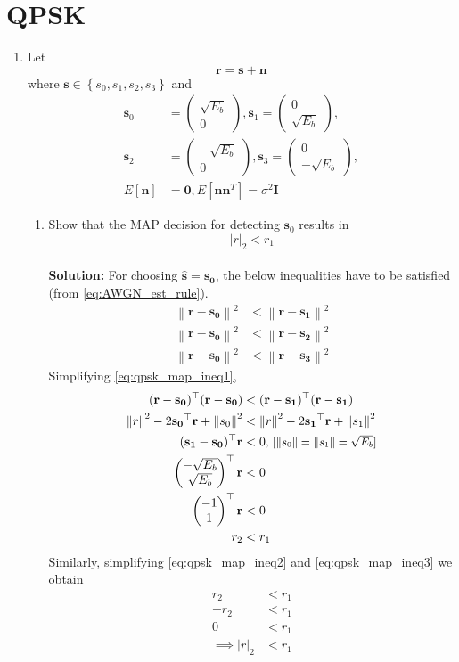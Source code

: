 \documentclass[journal,10pt,twocolumn]{IEEEtran}
\providecommand{\sbrak}[1]{\ensuremath{{}\left[#1\right]}}
\providecommand{\cbrak}[1]{\ensuremath{\left\{#1\right\}}}
\providecommand{\abs}[1]{\left\vert#1\right\vert}
\providecommand{\norm}[1]{\left\lVert#1\right\rVert}
\newcommand{\solution}{\noindent \textbf{Solution: }}
\newcommand{\myvec}[1]{\ensuremath{\begin{pmatrix}#1\end{pmatrix}}}
\let\vec\mathbf
\begin{document}
\section{QPSK}
\begin{enumerate}
\item
Let
\begin{equation}
\mathbf{r} = \mathbf{s}+ \mathbf{n}
\end{equation}
where $\mathbf{s} \in \cbrak{s_0,s_1,s_2, s_3}$ and
\begin{align}
\mathbf{s}_0 &= 
\myvec{
\sqrt{E_b}\\
0
},
\mathbf{s}_1 = 
\myvec{
0\\
\sqrt{E_b}
},
\\
\mathbf{s}_2 &= 
\myvec{
-\sqrt{E_b}\\
0
},
\mathbf{s}_3 = 
\myvec{
0\\
-\sqrt{E_b}
},
\\
E\sbrak{\mathbf{n}} &= \mathbf{0}, E\sbrak{\mathbf{n}\mathbf{n}^T} = \sigma^2 \mathbf{I}
\end{align}
%
\begin{enumerate}[label=(\alph{enumii})]
\item Show that the MAP decision for detecting $\mathbf{s}_0$ results in
\begin{equation}
\abs{r}_2 < r_1
\end{equation}\\
\solution For choosing $\vec{\hat{s}} = \vec{s_0}$, the below inequalities have to be satisfied (from \eqref{eq:AWGN_est_rule}).
\begin{align}
	\label{eq:qpsk_map_ineq1}
	\norm{\vec{r}-\vec{s_0}}^2 &< \norm{\vec{r}-\vec{s_1}}^2	\\
	\label{eq:qpsk_map_ineq2}
	\norm{\vec{r}-\vec{s_0}}^2 &< \norm{\vec{r}-\vec{s_2}}^2	\\
	\label{eq:qpsk_map_ineq3}
	\norm{\vec{r}-\vec{s_0}}^2 &< \norm{\vec{r}-\vec{s_3}}^2	
\end{align} 
Simplifying \eqref{eq:qpsk_map_ineq1},
\begin{align*}
	(\vec{r}-\vec{s_0})^{\top}(\vec{r}-\vec{s_0}) &< (\vec{r}-\vec{s_1})^{\top}(\vec{r}-\vec{s_1})\\
	\norm{r}^2 -2\vec{s_0}^{\top}\vec{r} + \norm{s_0}^2 &< \norm{r}^2 -2\vec{s_1}^{\top}\vec{r} + \norm{s_1}^2\\
	(\vec{s_1}-\vec{s_0})^{\top}\vec{r} &< 0 \text{\small,   $[\norm{s_0} = \norm{s_1} = \sqrt{E_b}$]}\\
	\myvec{-\sqrt{E_b}\\\sqrt{E_b}}^{\top}\vec{r} &< 0\\
	\myvec{-1\\1}^{\top}\vec{r} &< 0\\
	r_2 &< r_1
\end{align*}
Similarly, simplifying \eqref{eq:qpsk_map_ineq2} and \eqref{eq:qpsk_map_ineq3} we obtain
\begin{align*}
	r_2 &< r_1	\\
	-r_2 &< r_1 \\
	0 &< r_1	\\
	\implies \abs{r}_2 &< r_1
\end{align*} 


\end{enumerate}
\end{enumerate}
\end{document}
